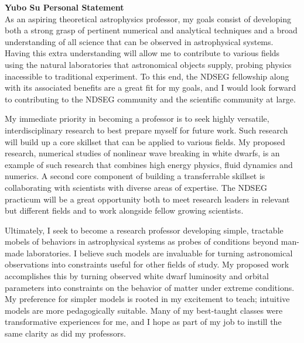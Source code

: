 \documentclass[11pt,
        usenames, %
        dvipsnames %
    ]{article}
\begin{document}
\def\Snospace~{\S{}} %
\renewcommand*{\sectionautorefname}{\Snospace}
\renewcommand*{\appendixautorefname}{\Snospace}
\renewcommand*{\figureautorefname}{Fig.}
\renewcommand*{\equationautorefname}{Eq.}
\renewcommand*{\tableautorefname}{Tab.}

\onehalfspacing

\textbf{Yubo Su Personal Statement}\\[\parskip]

As an aspiring theoretical astrophysics professor, my goals consist of
developing both a strong grasp of pertinent numerical and analytical techniques
and a broad understanding of all science that can be observed in astrophysical
systems. Having this extra understanding will allow me to contribute to various
fields using the natural laboratories that astronomical objects supply, probing
physics inacessible to traditional experiment. To this end, the NDSEG fellowship
along with its associated benefits are a great fit for my goals, and I would
look forward to contributing to the NDSEG community and the scientific community
at large.

My immediate priority in becoming a professor is to seek highly versatile,
interdisciplinary research to best prepare myself for future work. Such research
will build up a core skillset that can be applied to various fields. My proposed
research, numerical studies of nonlinear wave breaking in white dwarfs, is an
example of such research that combines high energy physics, fluid dynamics and
numerics. A second core component of building a transferrable skillset is
collaborating with scientists with diverse areas of expertise. The NDSEG
practicum will be a great opportunity both to meet research leaders in relevant
but different fields and to work alongside fellow growing scientists.

Ultimately, I seek to become a research professor developing simple, tractable
mobels of behaviors in astrophysical systems as probes of conditions
beyond man-made laboratories. I believe such models are invaluable for turning
astronomical observations into constraints useful for other fields of study. My
proposed work accomplishes this by turning observed white dwarf luminosity and
orbital parameters into constraints on the behavior of matter under extreme
conditions. My preference for simpler models is rooted in my excitement to
teach; intuitive models are more pedagogically suitable. Many of my best-taught
classes were transformative experiences for me, and I hope as part of my job to
instill the same clarity as did my professors.
\end{document}
